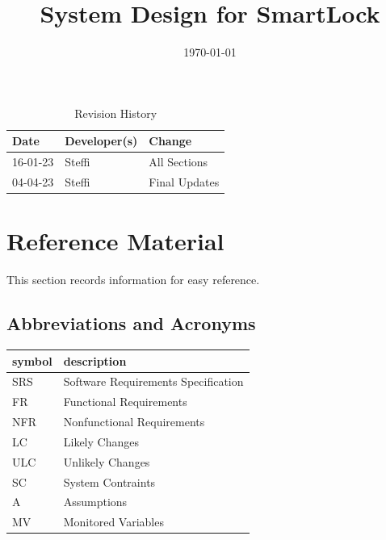 \documentclass[12pt, titlepage]{article}
\begin{document}
\title{System Design for SmartLock \progname{}} 
\author{\authname}
\date{\today}

\maketitle


\begin{table}[hp]
\caption{Revision History} \label{TblRevisionHistory}
\begin{tabularx}{\textwidth}{p{3cm}p{3cm}X}
\textbf{Date} & \textbf{Developer(s)} & \textbf{Change}\\
\midrule
16-01-23 & Steffi & All Sections\\
04-04-23 & Steffi & Final Updates\\
\bottomrule
\end{tabularx}
\end{table}

\newpage

\tableofcontents

\newpage

\listoftables

\listoffigures


\newpage

\section{Reference Material}

This section records information for easy reference.

\subsection{Abbreviations and Acronyms}

\renewcommand{\arraystretch}{1.2}
\begin{tabular}{l l} 
  \toprule		
  \textbf{symbol} & \textbf{description}\\
  \midrule 
  SRS & Software Requirements Specification\\
  FR & Functional Requirements\\
  NFR & Nonfunctional Requirements\\
  LC & Likely Changes\\
  ULC & Unlikely Changes\\
  SC & System Contraints\\
  A & Assumptions\\
  MV & Monitored Variables\\
  \bottomrule
\end{tabular}\\
\end{document}
